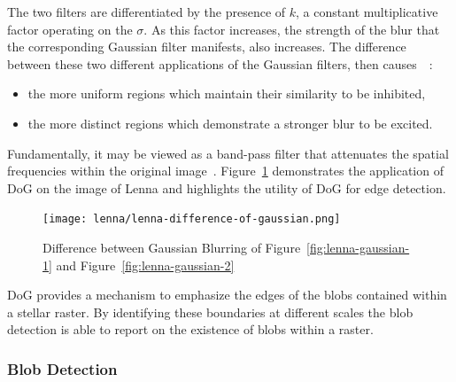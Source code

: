 The two filters are differentiated by the presence of $k$, a constant multiplicative factor operating on the $\sigma$. As this factor increases, the strength of the blur that the corresponding Gaussian filter manifests, also increases.
The difference between these two different applications of the Gaussian filters, then causes~~\cite{Marr1980}:
\begin{itemize}
    \item the more uniform regions which maintain their similarity to be inhibited,
    \item the more distinct regions which demonstrate a stronger blur to be excited.
\end{itemize}
Fundamentally, it may be viewed as a band-pass filter that attenuates the spatial frequencies within the original image~\cite{molecularDoG}. Figure~\ref{fig:lenna-difference-of-gaussian} demonstrates the application of DoG on the image of Lenna and highlights the utility of DoG for edge detection.

\begin{figure}[H]
    \centering
    \texttt{[image: lenna/lenna-difference-of-gaussian.png]}
    \caption{\label{fig:lenna-difference-of-gaussian} Difference between Gaussian Blurring of Figure~\ref{fig:lenna-gaussian-1} and Figure~\ref{fig:lenna-gaussian-2}}
\end{figure}
DoG provides a mechanism to emphasize the edges of the blobs contained within a stellar raster. By identifying these boundaries at different scales the blob detection is able to report on the existence of blobs within a raster.

\subsubsection{\label{sec:blob-detection}Blob Detection}

